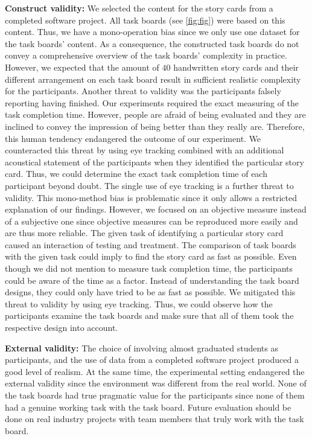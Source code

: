 \documentclass{llncs}
\begin{document}
\textbf{Construct validity:}
We selected the content for the story cards from a completed software project. 
All task boards (see \figurename{ \ref{fig:fig}}) were based on this content. 
Thus, we have a mono-operation bias since we only use one dataset for the task 
boards' content. As a consequence, the constructed task boards do not convey a 
comprehensive overview of the task boards' complexity in practice. However, we 
expected that the amount of $40$ handwritten story cards and their different 
arrangement on each task board result in sufficient realistic complexity for 
the participants.
Another threat to validity was the participants falsely reporting having 
finished. Our experiments required the exact measuring of the task 
completion time. However, people are afraid of being evaluated and they are 
inclined to convey the impression of being better than they really are. 
Therefore, this human tendency endangered the outcome of our experiment. We 
counteracted this threat by using eye tracking combined with an additional 
acoustical statement of the participants when they identified the particular 
story card. Thus, we could determine the exact task completion time of each 
participant beyond doubt.
The single use of eye tracking is a further threat to validity. This 
mono-method bias is problematic since it only allows a restricted explanation 
of our findings. However, we focused on an objective measure instead of a 
subjective one since objective measures can be reproduced more easily and are 
thus more reliable.
The given task of identifying a particular story card caused an interaction of 
testing and treatment. The comparison of task boards with the given task could 
imply to find the story card as fast as possible. Even though we did not 
mention to measure task completion time, the participants could be aware of the 
time as a factor. Instead of understanding the task board designs, they could 
only have tried to be as fast as possible. We mitigated this threat to validity 
by using eye tracking. Thus, we could observe how the participants examine the 
task boards and make sure that all of them took the respective design into 
account.

\textbf{External validity:}
The choice of involving almost graduated students as participants, and the use 
of data from a completed software project produced a good level of realism. At 
the same time, the experimental setting endangered the external validity since 
the environment was different from the real world. None of the task boards had 
true pragmatic value for the participants since none of them had a genuine 
working task with the task board. Future evaluation should be done on real 
industry projects with team members that truly work with the task board.
\end{document}
